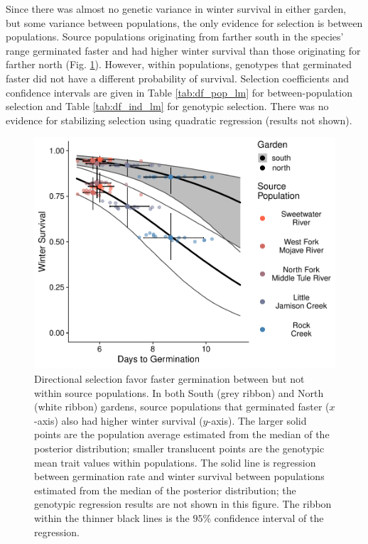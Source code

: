\documentclass[
  12pt,
]{article}
\begin{document}
Since there was almost no genetic variance in winter survival in either garden, but some variance between populations, the only evidence for selection is between populations. Source populations originating from farther south in the species' range germinated faster and had higher winter survival than those originating for farther north (Fig. \ref{fig:selection}). However, within populations, genotypes that germinated faster did not have a different probability of survival. Selection coefficients and confidence intervals are given in Table \ref{tab:df_pop_lm} for between-population selection and Table \ref{tab:df_ind_lm} for genotypic selection. There was no evidence for stabilizing selection using quadratic regression (results not shown).

\begin{figure}[ht]
  \includegraphics[width=\textwidth]{figures/selection.pdf}
  \caption{Directional selection favor faster germination between but not within source populations. In both South (grey ribbon) and North (white ribbon) gardens, source populations that germinated faster ($x$-axis) also had higher winter survival ($y$-axis). The larger solid points are the population average estimated from the median of the posterior distribution; smaller translucent points are the genotypic mean trait values within populations. The solid line is regression between germination rate and winter survival between populations estimated from the median of the posterior distribution; the genotypic regression results are not shown in this figure. The ribbon within the thinner black lines is the $95$\% confidence interval of the regression.}
  \label{fig:selection}
\end{figure}
\end{document}
